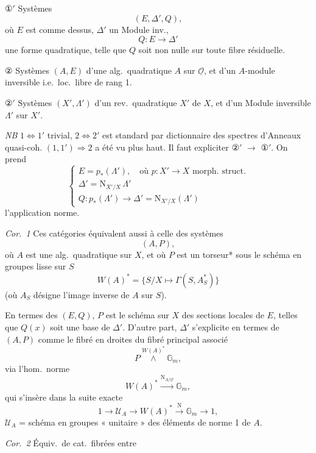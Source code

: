 \documentclass[11pt,a4paper]{article}
\begin{document}
①\('\) Systèmes
\[
  (E, \Delta', Q),
\]
où $E$ est comme dessus, $\Delta'$ un Module inv.,
\[
  Q \colon E \to \Delta'
\]
une forme quadratique, telle que $Q$ soit non  nulle sur toute fibre résiduelle.

② Systèmes \struck{\ill{}} $(A, E)$ d'une alg.\ quadratique $A$ sur $\underline{\mathcal{O}}$, et d'un $A$-module inversible i.e.\ loc.\ libre de rang 1.

②\('\) Systèmes $(X', \Lambda')$ d'un rev.\ quadratique $X'$ de $X$, et d'un Module inversible $\Lambda'$ sur $X'$.

\emph{NB} $1 \Leftrightarrow 1'$ trivial, $2 \Leftrightarrow 2'$ est standard par dictionnaire des spectres d'Anneaux quasi-coh. $(1, 1') \Rightarrow 2$ a été vu plus haut. Il faut expliciter ②\('\) $\to$ ①\('\). On prend
\[
  \left\{\begin{array}{l}
    E = p_{*}(\Lambda'), \quad \text{où } p \colon X' \to X \text{ morph.\ struct.} \\
    \Delta' = \mathrm{N}_{X'/X}\, \Lambda' \\
    Q \colon p_{*}(\Lambda') \to \Delta' = \mathrm{N}_{X'/X}(\Lambda')
  \end{array}\right.
\]
l'application norme.

\emph{Cor.\ 1} Ces catégories équivalent aussi à celle des systèmes
\[
  (A, P),
\]
où $A$ est une alg.\ quadratique sur $X$, et où $P$ est un torseur* sous le schéma en groupes lisse sur $S$ 
\[
  W(A)^{*} = \{ S/X \mapsto \Gamma(S, A_S^{*}) \}
\]
(où $A_S$ désigne l'image inverse de $A$ sur $S$).

En termes des $(E, Q)$, $P$ est le  schéma sur $X$ des sections locales de $E$, telles que $Q(x)$ soit une base de $\Delta'$. D'autre part, $\Delta'$ s'explicite en termes de $(A, P)$ comme le fibré en droites  du fibré principal associé
\[
  P \overset{W(A)^{*}}{\wedge} \mathbb{G}_m ,
\]
via l'hom.\ norme
\[
  W(A)^{*} \xrightarrow{\mathrm{N}_{A/\underline{\mathcal{O}}}} \mathbb{G}_m ,
\]
qui s'insère dans la suite exacte
\[
  1 \to \mathcal{U}_A \to W(A)^{*} \xrightarrow{\mathrm{N}} \mathbb{G}_m \to 1,
\]
$\mathcal{U}_A$ = schéma en groupes « unitaire » des éléments de norme 1 de $A$.

\emph{Cor.\ 2} Équiv.\ de cat.\ fibrées entre
\end{document}
